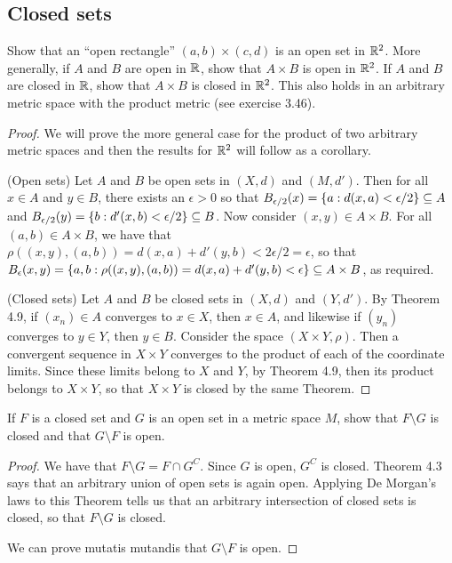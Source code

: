 \subsection{Closed sets}


\begin{exercise}{1}
Show that an ``open rectangle'' $(a,b)\times (c,d)$ is an open set in $\mathbb{R}^2$. More generally, if $A$ and $B$ are open in $\mathbb{R}$, show that $A\times B$ is open in $\mathbb{R}^2$. 
If $A$ and $B$ are closed in $\mathbb{R}$, show that $A\times B$ is closed in $\mathbb{R}^2$. 
This also holds in an arbitrary metric space with the product metric (see exercise 3.46).
\end{exercise}
\begin{proof}
We will prove the more general case for the product of two arbitrary metric spaces and then the results for $\mathbb{R}^2$ will follow as a corollary.

(Open sets) Let $A$ and $B$ be open sets in $(X,d)$ and $(M,d')$. 
Then for all $x\in A$ and $y\in B$, there exists an $\epsilon>0$ so that $B_{\epsilon/2}(x)=\{a:d(x,a)<\epsilon/2\}\subseteq A$ and $B_{\epsilon/2}(y)=\{b:d'(x,b)<\epsilon/2\}\subseteq B$. 
Now consider $(x,y)\in A\times B$. 
For all $(a,b)\in A\times B$, we have that $\rho((x,y),(a,b))=d(x,a)+d'(y,b)<2\epsilon/2=\epsilon$, so that $B_\epsilon(x,y)=\{a,b:\rho((x,y),(a,b))=d(x,a)+d'(y,b)<\epsilon\}\subseteq A\times B$, as required.

(Closed sets) Let $A$ and $B$ be closed sets in $(X,d)$ and $(Y,d')$. 
By Theorem 4.9, if $(x_n)\in A$ converges to $x\in X$, then $x\in A$, and likewise if $(y_n)$ converges to $y\in Y$, then $y\in B$. 
Consider the space $(X\times Y, \rho)$. 
Then a convergent sequence in $X\times Y$ converges to the product of each of the coordinate limits. 
Since these limits belong to $X$ and $Y$, by Theorem 4.9, then its product belongs to $X\times Y$, so that $X\times Y$ is closed by the same Theorem.
\end{proof} 

\begin{exercise}{2}
If $F$ is a closed set and $G$ is an open set in a metric space $M$, show that $F\setminus G$ is closed and that $G\setminus F$ is open.
\end{exercise}
\begin{proof}
We have that $F\setminus G= F\cap G^C$. Since $G$ is open, $G^C$ is closed. 
Theorem 4.3 says that an arbitrary union of open sets is again open. 
Applying De Morgan's laws to this Theorem tells us that an arbitrary intersection of closed sets is closed, so that $F\setminus G$ is closed.

We can prove mutatis mutandis that $G\setminus F$ is open.
\end{proof} 

